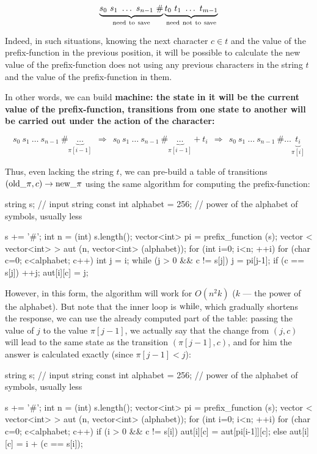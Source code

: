 $$ \underbrace{s_0\ s_1\ \ldots\ s_{n-1}\ \#}_{\rm need\ to\ save} \underbrace{t_0\ t_1\ \ldots\ t_{m-1}}_{\rm need\ not\ to\ save} $$

Indeed, in such situations, knowing the next character $c \in t$ and the value of the prefix-function in the previous position, it will be possible to calculate the new value of the prefix-function does not using any previous characters in the string $t$ and the value of the prefix-function in them.

In other words, we can build \bf{machine}: the state in it will be the current value of the prefix-function, transitions from one state to another will be carried out under the action of the character:

$$ s_0\ s_1\ \ldots\ s_{n-1}\ \# \underbrace{\ldots}_{\pi[i-1]}\ \ \Longrightarrow\ \ s_0\ s_1\ \ldots\ s_{n-1}\ \# \underbrace{\ldots}_{\pi[i-1]} + t_i\ \ \Longrightarrow\ \ s_0\ s_1\ \ldots\ s_{n-1}\ \# \ldots \underbrace{t_i}_{\pi[i]} $$

Thus, even lacking the string $t$, we can pre-build a table of transitions $({\rm old}\_\pi,c) \rightarrow {\rm new}\_\pi$ using the same algorithm for computing the prefix-function:

\code
string s; // input string
const int alphabet = 256; // power of the alphabet of symbols, usually less

s += '#';
int n = (int) s.length();
vector<int> pi = prefix_function (s);
vector < vector<int> > aut (n, vector<int> (alphabet));
for (int i=0; i<n; ++i)
for (char c=0; c<alphabet; c++) {
int j = i;
while (j > 0 && c != s[j])
j = pi[j-1];
if (c == s[j]) ++j;
aut[i][c] = j;
}
\endcode

However, in this form, the algorithm will work for $O(n^2 k)$ ($k$ --- the power of the alphabet). But note that the inner loop is $\rm while$, which gradually shortens the response, we can use the already computed part of the table: passing the value of $j$ to the value $\pi[j-1]$, we actually say that the change from $(j, c)$ will lead to the same state as the transition $(\pi[j-1], c)$, and for him the answer is calculated exactly (since $\pi[j-1] < j$):

\code
string s; // input string
const int alphabet = 256; // power of the alphabet of symbols, usually less

s += '#';
int n = (int) s.length();
vector<int> pi = prefix_function (s);
vector < vector<int> > aut (n, vector<int> (alphabet));
for (int i=0; i<n; ++i)
for (char c=0; c<alphabet; c++)
if (i > 0 && c != s[i])
aut[i][c] = aut[pi[i-1]][c];
else
aut[i][c] = i + (c == s[i]);
\endcode

